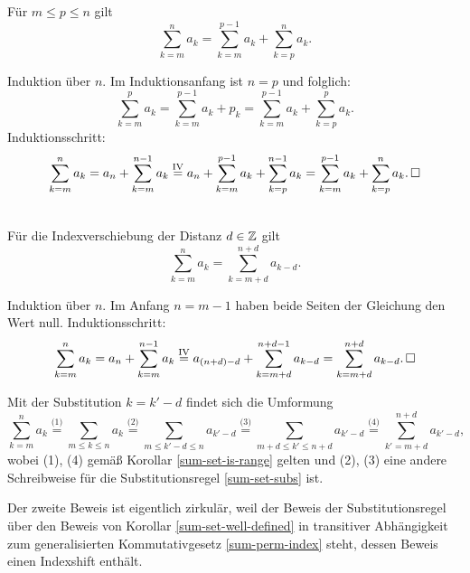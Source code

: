 \begin{Korollar}\label{sum-split}
Für $m\le p\le n$ gilt
\[\sum_{k=m}^n a_k = \sum_{k=m}^{p-1} a_k + \sum_{k=p}^n a_k.\]
\end{Korollar}
\begin{Beweis} Induktion über $n$. Im Induktionsanfang ist $n=p$
und folglich:
\[\sum_{k=m}^p a_k = \sum_{k=m}^{p-1} a_k + p_k
= \sum_{k=m}^{p-1} a_k + \sum_{k=p}^p a_k.\]
Induktionsschritt:
\[\sum_{k=m}^n a_k = a_n + \sum_{k=m}^{n-1} a_k
\stackrel{\mathrm{IV}}= a_n + \sum_{k=m}^{p-1} a_k + \sum_{k=p}^{n-1} a_k
= \sum_{k=m}^{p-1} a_k + \sum_{k=p}^n a_k.\,\square\]
\end{Beweis}

\begin{Korollar}[Indexshift]\label{sum-indexshift}\mbox{}\\
Für die Indexverschiebung der Distanz $d\in\mathbb Z$ gilt
\[\textstyle\sum_{k=m}^n a_k = \sum_{k=m+d}^{n+d} a_{k-d}.\]
\end{Korollar}
\begin{Beweis}[Beweis 1]
Induktion über $n$. Im Anfang $n = m-1$ haben beide Seiten
der Gleichung den Wert null. Induktionsschritt:
\[\sum_{k=m}^n a_k = a_n+\sum_{k=m}^{n-1}a_k \stackrel{\mathrm{IV}}=
a_{(n+d)-d}+\sum_{k=m+d}^{n+d-1}a_{k-d}
= \sum_{k=m+d}^{n+d}a_{k-d}.\,\square\]
\end{Beweis}
\begin{Beweis}[Beweis 2]
Mit der Substitution $k=k'-d$ findet sich die Umformung
\[\sum_{k=m}^n a_k \stackrel{\text{(1)}}= \sum_{m\le k\le n} a_k
\stackrel{\text{(2)}}= \sum_{m\le k'-d\le n} a_{k'-d}
\stackrel{\text{(3)}}= \sum_{m+d\le k'\le n+d} a_{k'-d}
\stackrel{\text{(4)}}= \sum_{k'=m+d}^{n+d} a_{k'-d},\]
wobei (1), (4) gemäß Korollar \ref{sum-set-is-range} gelten
und (2), (3) eine andere Schreibweise für die Substitutionsregel
\ref{sum-set-subs} ist.\,\qedsymbol
\end{Beweis}
 Der zweite Beweis ist eigentlich zirkulär,
weil der Beweis der Substitutionsregel über den Beweis von
Korollar \ref{sum-set-well-defined} in transitiver Abhängigkeit zum
generalisierten Kommutativgesetz \ref{sum-perm-index} steht, dessen
Beweis einen Indexshift enthält.

